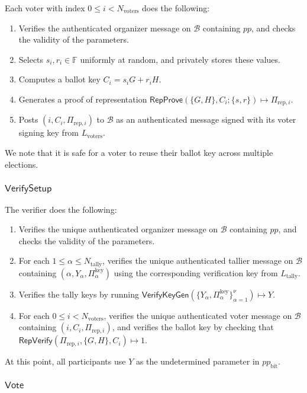\documentclass{llncs}
\newcommand{\F}{\mathbb{F}}
\newcommand{\func}[1]{\mathsf{#1}}
\begin{document}
Each voter with index $0 \leq i < N_{\text{voters}}$ does the following:
\begin{enumerate}
    \item Verifies the authenticated organizer message on $\mathcal{B}$ containing $pp$, and checks the validity of the parameters.
    \item Selects $s_i, r_i \in \F$ uniformly at random, and privately stores these values.
    \item Computes a ballot key $C_i = s_i G + r_i H$.
    \item Generates a proof of representation $\func{RepProve}(\{G, H\}, C_i ; \{s, r\}) \mapsto \Pi_{\text{rep},i}$.
    \item Posts $(i, C_i, \Pi_{\text{rep},i})$ to $\mathcal{B}$ as an authenticated message signed with its voter signing key from $L_{\text{voters}}$.
\end{enumerate}
We note that it is safe for a voter to reuse their ballot key across multiple elections.


\subsubsection{\texorpdfstring{$\func{VerifySetup}$}{VerifySetup}}

The verifier does the following:
\begin{enumerate}
    \item Verifies the unique authenticated organizer message on $\mathcal{B}$ containing $pp$, and checks the validity of the parameters.
    \item For each $1 \leq \alpha \leq N_{\text{tally}}$, verifies the unique authenticated tallier message on $\mathcal{B}$ containing $(\alpha, Y_\alpha, \Pi_\alpha^{\text{key}})$ using the corresponding verification key from $L_{\text{tally}}$.
    \item Verifies the tally keys by running $\func{VerifyKeyGen}(\{Y_\alpha, \Pi_\alpha^{\text{key}}\}_{\alpha=1}^{\nu}) \mapsto Y$.
    \item For each $0 \leq i < N_{\text{voters}}$, verifies the unique authenticated voter message on $\mathcal{B}$ containing $(i, C_i, \Pi_{\text{rep},i})$, and verifies the ballot key by checking that $\func{RepVerify}(\Pi_{\text{rep},i}, \{G, H\}, C_i) \mapsto 1$.
\end{enumerate}
At this point, all participants use $Y$ as the undetermined parameter in $pp_{\text{bit}}$.


\subsubsection{\texorpdfstring{$\func{Vote}$}{Vote}}
\end{document}
